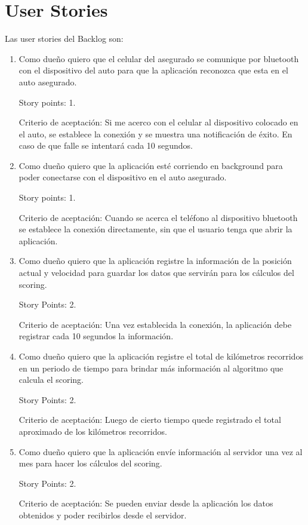 \section{User Stories}

Las user stories del Backlog son:
\begin{enumerate}
\item Como dueño quiero que el celular del asegurado se comunique por bluetooth con el dispositivo del auto para que la aplicación reconozca que esta en el auto 
asegurado. 

Story points: 1.

Criterio de aceptación: Si me acerco con el celular al dispositivo colocado en el auto, se establece la conexión y se muestra una notificación de éxito. En caso de que falle se intentará cada 10 segundos.

\item Como dueño quiero que la aplicación esté corriendo en background para poder conectarse con el dispositivo en el auto asegurado. 

Story points: 1.

Criterio de aceptación: Cuando se acerca el teléfono al dispositivo bluetooth se establece la conexión directamente, sin que el usuario tenga que abrir la aplicación.

\item Como dueño quiero que la aplicación registre la información de la posición actual y velocidad para guardar los datos que servirán para los cálculos del 
scoring. 

Story Points: 2.

Criterio de aceptación: Una vez establecida la conexión, la aplicación debe registrar cada 10 segundos la información.

\item Como dueño quiero que la aplicación registre el total de kilómetros recorridos en un periodo de tiempo para brindar más información al algoritmo que calcula el 
scoring. 

Story Points: 2.

Criterio de aceptación: Luego de cierto tiempo quede registrado el total aproximado de los kilómetros recorridos.

\item Como dueño quiero que la aplicación envíe información al servidor una vez al mes para hacer los cálculos del scoring. 

Story Points: 2.

Criterio de aceptación:
Se pueden enviar desde la aplicación los datos obtenidos y poder recibirlos desde el servidor.

\end{enumerate}

